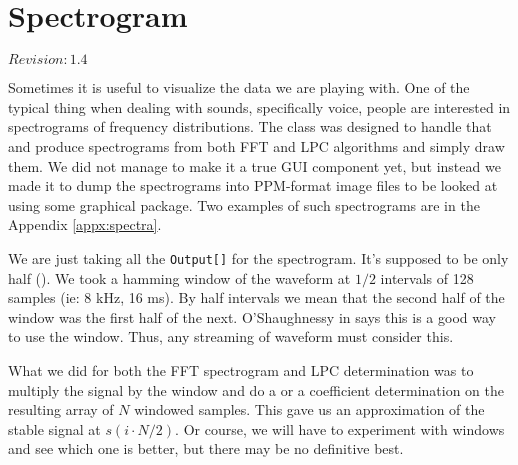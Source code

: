 \section{Spectrogram}

$Revision: 1.4 $

Sometimes it is useful to visualize the data we are
playing with. One of the typical thing when dealing with
sounds, specifically voice, people are interested in
spectrograms of frequency distributions. The 
class was designed to handle that and produce spectrograms
from both FFT and LPC algorithms and simply draw them. We did not
manage to make it a true GUI component yet, but instead we made
it to dump the spectrograms into PPM-format image files to be
looked at using some graphical package. Two examples of
such spectrograms are in the Appendix \ref{appx:spectra}.

We are just taking all the \verb+Output[]+ for the spectrogram. It's
supposed to be only half (\cite{shaughnessy2000}).
We took a hamming window of the waveform at $1/2$ intervals of 128
samples (ie: 8 kHz, 16 ms). By half intervals we mean that the second half
of the window was the first half of the next. O'Shaughnessy in \cite{shaughnessy2000} says this is a
good way to use the window. Thus, any streaming of waveform must consider
this.

What we did for both the FFT spectrogram and LPC determination was to
multiply the signal by the window and do a  or a  coefficient
determination on the resulting array of $N$ windowed samples. This gave us
an approximation of the stable signal at $s(i \cdot N/2)$.
Or course, we will have to experiment with windows and see which one is better, but
there may be no definitive best.

